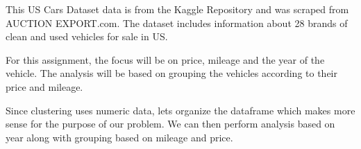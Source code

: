 \documentclass[
]{article}
\newenvironment{Shaded}{\begin{snugshade}}{\end{snugshade}}
\newcommand{\FunctionTok}[1]{\textcolor[rgb]{0.00,0.00,0.00}{#1}}
\newcommand{\NormalTok}[1]{#1}
\newcommand{\OtherTok}[1]{\textcolor[rgb]{0.56,0.35,0.01}{#1}}
\newcommand{\SpecialCharTok}[1]{\textcolor[rgb]{0.00,0.00,0.00}{#1}}
\begin{document}
This US Cars Dataset data is from the Kaggle Repository and was scraped
from AUCTION EXPORT.com. The dataset includes information about 28
brands of clean and used vehicles for sale in US.

For this assignment, the focus will be on price, mileage and the year of
the vehicle. The analysis will be based on grouping the vehicles
according to their price and mileage.

Since clustering uses numeric data, lets organize the dataframe which
makes more sense for the purpose of our problem. We can then perform
analysis based on year along with grouping based on mileage and price.

\begin{Shaded}
\end{Shaded}
\end{document}
